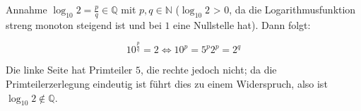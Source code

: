 \begin{flushenum}
\item Annahme $\log_{10} 2 = \frac{p}{q} \in \mathbb{Q}$ mit $p,q \in
\mathbb{N}$ ($\log_{10} 2$ > 0, da die Logarithmusfunktion streng monoton
steigend ist und bei $1$ eine Nullstelle hat). Dann folgt:

\[ 10^{\frac{p}{q}} = 2 \Leftrightarrow 10^p = 5^p 2^p = 2^q \]

Die linke Seite hat Primteiler $5$, die rechte jedoch nicht; da die
Primteilerzerlegung eindeutig ist führt dies zu einem Widerspruch, also ist
$\log_{10} 2 \not\in \mathbb{Q}$.
\end{flushenum}

